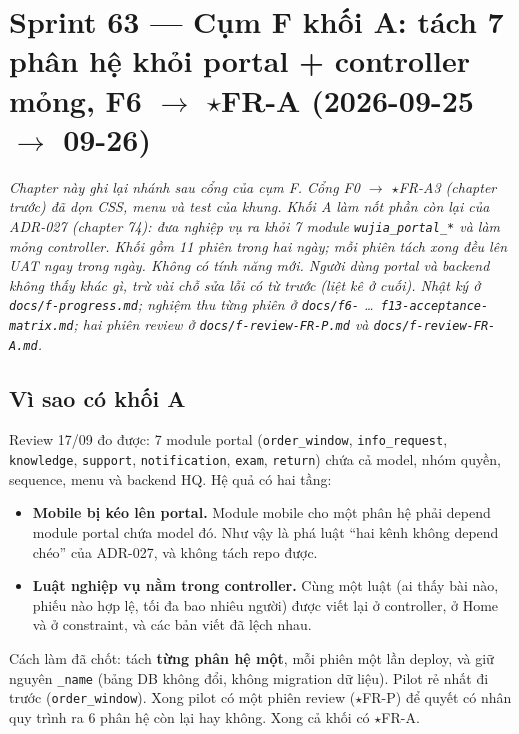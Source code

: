 \chapter{Sprint 63 --- Cụm F khối A: tách 7 phân hệ khỏi portal + controller mỏng, F6 $\to$ $\star$FR-A (2026-09-25 $\to$ 09-26)}

\emph{Chapter này ghi lại nhánh sau cổng của cụm F. Cổng F0 $\to$ $\star$FR-A3 (chapter trước) đã dọn CSS,
menu và test của khung. Khối A làm nốt phần còn lại của ADR-027 (chapter 74): đưa nghiệp vụ ra khỏi
7 module \texttt{wujia\_portal\_*} và làm mỏng controller. Khối gồm 11 phiên trong hai ngày; mỗi phiên tách
xong đều lên UAT ngay trong ngày. Không có tính năng mới. Người dùng portal và backend không thấy khác gì,
trừ vài chỗ sửa lỗi có từ trước (liệt kê ở cuối). Nhật ký ở \texttt{docs/f-progress.md}; nghiệm thu từng phiên ở
\texttt{docs/f6-} \ldots\ \texttt{f13-acceptance-matrix.md}; hai phiên review ở \texttt{docs/f-review-FR-P.md} và
\texttt{docs/f-review-FR-A.md}.}

\section{Vì sao có khối A}

Review 17/09 đo được: 7 module portal (\texttt{order\_window}, \texttt{info\_request}, \texttt{knowledge},
\texttt{support}, \texttt{notification}, \texttt{exam}, \texttt{return}) chứa cả model, nhóm quyền, sequence,
menu và backend HQ. Hệ quả có hai tầng:
\begin{itemize}[nosep]
\item \textbf{Mobile bị kéo lên portal.} Module mobile cho một phân hệ phải depend module portal chứa model đó.
  Như vậy là phá luật ``hai kênh không depend chéo'' của ADR-027, và không tách repo được.
\item \textbf{Luật nghiệp vụ nằm trong controller.} Cùng một luật (ai thấy bài nào, phiếu nào hợp lệ, tối đa bao
  nhiêu người) được viết lại ở controller, ở Home và ở constraint, và các bản viết đã lệch nhau.
\end{itemize}

Cách làm đã chốt: tách \textbf{từng phân hệ một}, mỗi phiên một lần deploy, và giữ nguyên \texttt{\_name}
(bảng DB không đổi, không migration dữ liệu). Pilot rẻ nhất đi trước (\texttt{order\_window}). Xong pilot có một
phiên review ($\star$FR-P) để quyết có nhân quy trình ra 6 phân hệ còn lại hay không. Xong cả khối có
$\star$FR-A.

